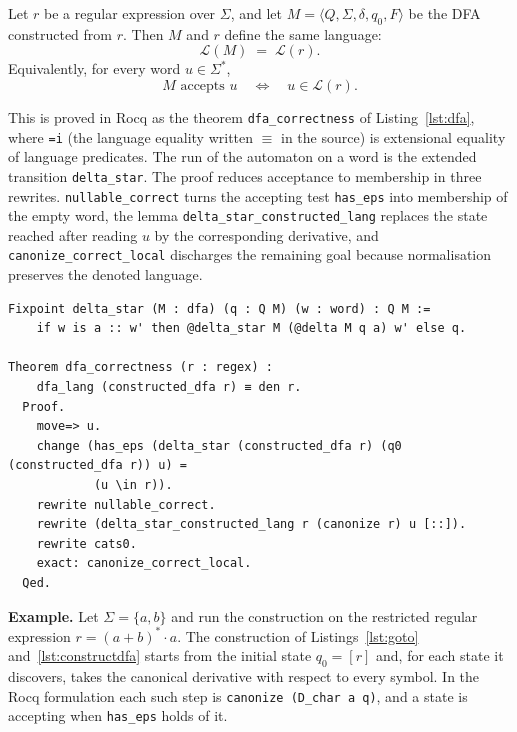 \begin{theorem}\label{the:dfa-correctness}
Let $r$ be a regular expression over $\Sigma$, and let
$M=\langle Q,\Sigma,\delta,q_0,F\rangle$ be the DFA constructed from $r$. Then $M$
and $r$ define the same language:
\[
  \mathcal{L}(M) \;=\; \mathcal{L}(r).
\]
Equivalently, for every word $u\in\Sigma^{*}$,
\[
  M \text{ accepts } u
  \quad\Longleftrightarrow\quad
  u \in \mathcal{L}(r).
\]
\end{theorem}

This is proved in Rocq as the theorem \texttt{dfa\_correctness} of
Listing~\ref{lst:dfa}, where \texttt{=i} (the language equality written $\equiv$ in
the source) is extensional equality of language predicates. The run of the automaton
on a word is the extended transition \texttt{delta\_star}. The proof reduces
acceptance to membership in three rewrites.
\texttt{nullable\_correct} turns the accepting test \texttt{has\_eps} into membership
of the empty word, the lemma \texttt{delta\_star\_constructed\_lang} replaces the
state reached after reading $u$ by the corresponding derivative, and
\texttt{canonize\_correct\_local} discharges the remaining goal because normalisation
preserves the denoted language.

\begin{lstlisting}[style=rocqstyle,caption={The run of the automaton and the formalised correctness proof (\texttt{Automata.v}).},label={lst:dfa}]
Fixpoint delta_star (M : dfa) (q : Q M) (w : word) : Q M :=
    if w is a :: w' then @delta_star M (@delta M q a) w' else q.

Theorem dfa_correctness (r : regex) :
    dfa_lang (constructed_dfa r) ≡ den r.
  Proof.
    move=> u.
    change (has_eps (delta_star (constructed_dfa r) (q0 (constructed_dfa r)) u) =
            (u \in r)).
    rewrite nullable_correct.
    rewrite (delta_star_constructed_lang r (canonize r) u [::]).
    rewrite cats0.
    exact: canonize_correct_local.
  Qed.
\end{lstlisting}

\medskip
\noindent\textbf{Example.}
Let $\Sigma=\{a,b\}$ and run the construction on the restricted regular expression
$r=(a+b)^{*}\cdot a$. The construction of Listings~\ref{lst:goto}
and~\ref{lst:constructdfa} starts from the
initial state $q_0=[r]$ and, for each state it discovers, takes the canonical
derivative with respect to every symbol. In the Rocq formulation each such step is
\texttt{canonize (D\_char a q)}, and a state is accepting when \texttt{has\_eps}
holds of it.


